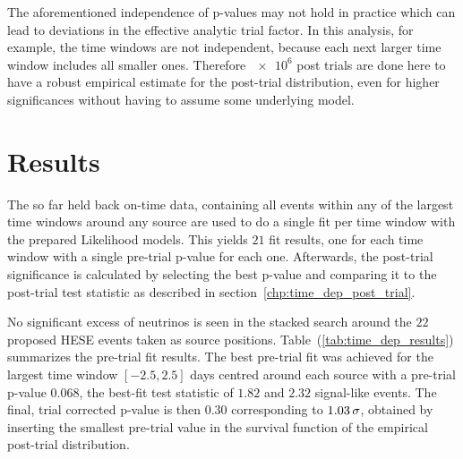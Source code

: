 The aforementioned independence of p-values may not hold in practice which can lead to deviations in the effective analytic trial factor.
In this analysis, for example, the time windows are not independent, because each next larger time window includes all smaller ones.
Therefore $\num{e6}$ post trials are done here to have a robust empirical estimate for the post-trial distribution, even for higher significances without having to assume some underlying model.

\section{Results}
The so far held back on-time data, containing all events within any of the largest time windows around any source are used to do a single fit per time window with the prepared Likelihood models.
This yields $\num{21}$ fit results, one for each time window with a single pre-trial p-value for each one.
Afterwards, the post-trial significance is calculated by selecting the best p-value and comparing it to the post-trial test statistic as described in section~\ref{chp:time_dep_post_trial}.

No significant excess of neutrinos is seen in the stacked search around the $\num{22}$ proposed HESE events taken as source positions.
Table~(\ref{tab:time_dep_results}) summarizes the pre-trial fit results.
The best pre-trial fit was achieved for the largest time window $[-2.5, 2.5]$ days centred around each source with a pre-trial p-value $\num{0.068}$, the best-fit test statistic of $\num{1.82}$ and $\num{2.32}$ signal-like events.
The final, trial corrected p-value is then $\num{0.30}$ corresponding to $1.0\num{3}\,\sigma$, obtained by inserting the smallest pre-trial value in the survival function of the empirical post-trial distribution.

